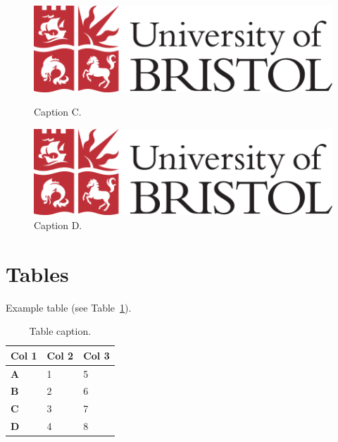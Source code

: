 \begin{figure}[h]
    \centering
    \begin{minipage}[h]{0.45\textwidth}
        \centering
        \includegraphics[width=\textwidth]{images/Logo - colour PNG.png}
        \caption{Caption C.}
        \label{fig:captionc}
    \end{minipage}
    \hfill
    \begin{minipage}[h]{0.45\textwidth}
        \centering
        \includegraphics[width=\textwidth]{images/Logo - colour PNG.png}
        \caption{Caption D.}
        \label{fig:captiond}
    \end{minipage}
\end{figure}


\section{Tables}

Example table (see Table~\ref{tb:table-example}). 

\begin{table}[h]
\caption{Table caption.}
\label{tb:table-example}
\begin{tabularx}{\textwidth}{XXX}
\toprule
\textbf{Col 1} & \textbf{Col 2} & \textbf{Col 3} \\ \midrule
\textbf{A}     & 1              & 5              \\
\textbf{B}     & 2              & 6              \\
\textbf{C}     & 3              & 7              \\
\textbf{D}     & 4              & 8              \\ \bottomrule
\end{tabularx}%
\end{table}


